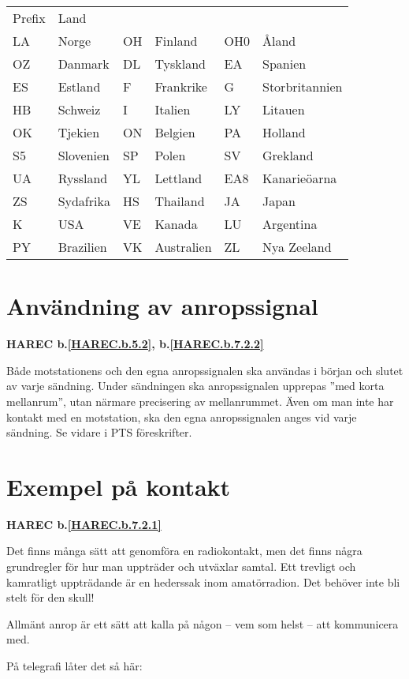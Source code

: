 \begin{tabular}{llllll}
    Prefix & Land& & & &  \\
    LA & Norge & OH & Finland & OH0 & Åland\\
    OZ & Danmark & DL & Tyskland & EA & Spanien\\
    ES & Estland & F & Frankrike & G & Storbritannien\\
    HB & Schweiz & I & Italien & LY & Litauen\\
    OK & Tjekien & ON & Belgien & PA & Holland\\
    S5 & Slovenien & SP & Polen & SV & Grekland\\
    UA & Ryssland & YL & Lettland & EA8 & Kanarieöarna\\
    ZS & Sydafrika & HS & Thailand & JA & Japan\\
    K & USA & VE & Kanada & LU & Argentina\\
    PY & Brazilien & VK & Australien & ZL & Nya Zeeland\\
\end{tabular}


\section{Användning av anropssignal}
\textbf{HAREC
  b.\ref{HAREC.b.5.2}\label{myHAREC.b.5.2},
  b.\ref{HAREC.b.7.2.2}\label{myHAREC.b.7.2.2}
}

Både motstationens och den egna anropssignalen ska användas i början
och slutet av varje sändning.
Under sändningen ska anropssignalen upprepas ''med korta mellanrum'', utan
närmare precisering av mellanrummet.
Även om man inte har kontakt med en motstation, ska den egna anropssignalen
anges vid varje sändning.
Se vidare i PTS föreskrifter.

\section{Exempel på kontakt}
\textbf{HAREC
  b.\ref{HAREC.b.7.2.1}\label{myHAREC.b.7.2.1}
}

Det finns många sätt att genomföra en radiokontakt, men det finns
några grundregler för hur man uppträder och utväxlar samtal.
Ett trevligt och kamratligt uppträdande är en hederssak inom amatörradion.
Det behöver inte bli stelt för den skull!

Allmänt anrop är ett sätt att kalla på någon
-- vem som helst -- att kommunicera med.

På telegrafi låter det så här:

